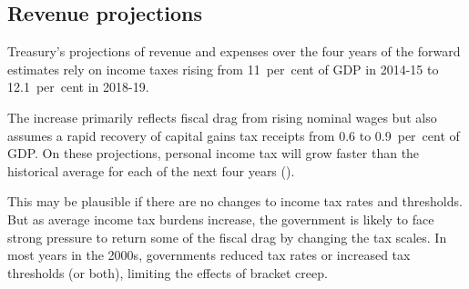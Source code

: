 \documentclass[twoside,english]{Dianab5ona4portrait}
\begin{document}
\subsection{Revenue projections}
Treasury’s projections of revenue and expenses over the four years of the forward estimates rely on income taxes rising from 11~per~cent of GDP in 2014-15 to 12.1~per~cent in 2018-19. 

The increase primarily reflects fiscal drag from rising nominal wages but also assumes a rapid recovery of capital gains tax receipts from 0.6 to 0.9~per~cent of GDP\@. On these projections, personal income tax will grow faster than the historical average for each of the next four years ().

This may be plausible if there are no changes to income tax rates and thresholds. But as average income tax burdens increase, the government is likely to face strong pressure to return some of the fiscal drag by changing the tax scales. In most years in the 2000s, governments reduced tax rates or increased tax thresholds (or both), limiting the effects of bracket creep. 
\end{document}
